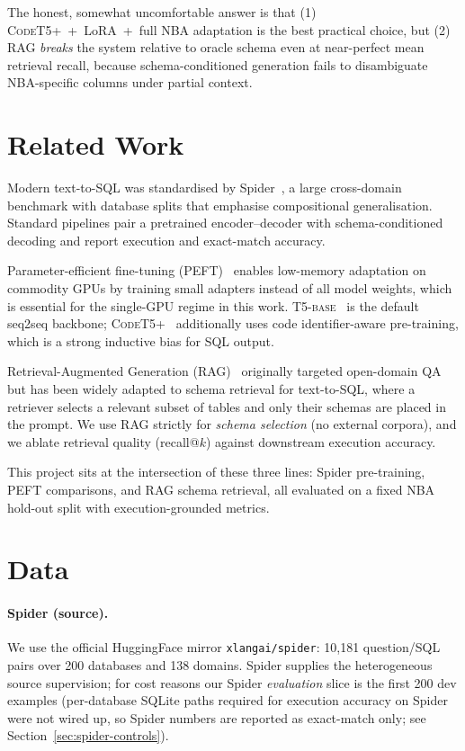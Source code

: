 \documentclass[11pt,a4paper]{article}
\newcommand{\codet}{\textsc{CodeT5+}}
\newcommand{\tfive}{\textsc{T5-base}}
\begin{document}
The honest, somewhat uncomfortable answer is that
(1) \codet{}~+~LoRA~+~full NBA adaptation is the best practical choice, but
(2) RAG \emph{breaks} the system relative to oracle schema even at near-perfect
mean retrieval recall, because schema-conditioned generation fails to
disambiguate NBA-specific columns under partial context.

\section{Related Work}
\label{sec:related}

Modern text-to-SQL was standardised by Spider~\cite{yu2018spider}, a large
cross-domain benchmark with database splits that emphasise compositional
generalisation. Standard pipelines pair a pretrained encoder--decoder with
schema-conditioned decoding and report execution and exact-match accuracy.

Parameter-efficient fine-tuning (PEFT)~\cite{hu2022lora,dettmers2023qlora}
enables low-memory adaptation on commodity GPUs by training small adapters
instead of all model weights, which is essential for the single-GPU regime in
this work. \tfive{}~\cite{raffel2020t5} is the default seq2seq backbone;
\codet{}~\cite{wang2021codet5} additionally uses code identifier-aware
pre-training, which is a strong inductive bias for SQL output.

Retrieval-Augmented Generation (RAG)~\cite{lewis2020rag} originally targeted
open-domain QA but has been widely adapted to schema retrieval for text-to-SQL,
where a retriever selects a relevant subset of tables and only their schemas
are placed in the prompt. We use RAG strictly for \emph{schema selection} (no
external corpora), and we ablate retrieval quality (recall@$k$) against
downstream execution accuracy.

This project sits at the intersection of these three lines: Spider
pre-training, PEFT comparisons, and RAG schema retrieval, all evaluated on a
fixed NBA hold-out split with execution-grounded metrics.

\section{Data}
\label{sec:data}

\paragraph{Spider (source).}
We use the official HuggingFace mirror \texttt{xlangai/spider}: 10{,}181
question/SQL pairs over 200 databases and 138 domains. Spider supplies the
heterogeneous source supervision; for cost reasons our Spider \emph{evaluation}
slice is the first 200 dev examples (per-database SQLite paths required for
execution accuracy on Spider were not wired up, so Spider numbers are reported
as exact-match only; see Section~\ref{sec:spider-controls}).
\end{document}
